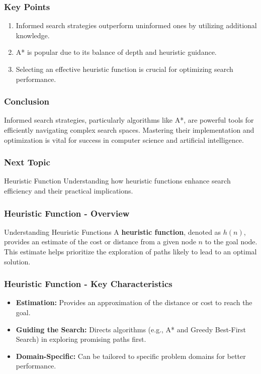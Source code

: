 \documentclass[aspectratio=169]{beamer}
\begin{document}
\begin{frame}[fragile]
  \frametitle{Key Points}
  \begin{enumerate}
    \item Informed search strategies outperform uninformed ones by utilizing additional knowledge.
    \item A* is popular due to its balance of depth and heuristic guidance.
    \item Selecting an effective heuristic function is crucial for optimizing search performance.
  \end{enumerate}
\end{frame}

\begin{frame}[fragile]
  \frametitle{Conclusion}
  Informed search strategies, particularly algorithms like A*, are powerful tools for efficiently navigating complex search spaces. Mastering their implementation and optimization is vital for success in computer science and artificial intelligence.
\end{frame}

\begin{frame}[fragile]
  \frametitle{Next Topic}
  \begin{block}{Heuristic Function}
    Understanding how heuristic functions enhance search efficiency and their practical implications.
  \end{block}
\end{frame}

\begin{frame}[fragile]
    \frametitle{Heuristic Function - Overview}
    \begin{block}{Understanding Heuristic Functions}
        A \textbf{heuristic function}, denoted as \( h(n) \), provides an estimate of the cost or distance from a given node \( n \) to the goal node. 
        This estimate helps prioritize the exploration of paths likely to lead to an optimal solution.
    \end{block}
\end{frame}

\begin{frame}[fragile]
    \frametitle{Heuristic Function - Key Characteristics}
    \begin{itemize}
        \item \textbf{Estimation:} Provides an approximation of the distance or cost to reach the goal.
        \item \textbf{Guiding the Search:} Directs algorithms (e.g., A* and Greedy Best-First Search) in exploring promising paths first.
        \item \textbf{Domain-Specific:} Can be tailored to specific problem domains for better performance.
    \end{itemize}
\end{frame}
\end{document}
